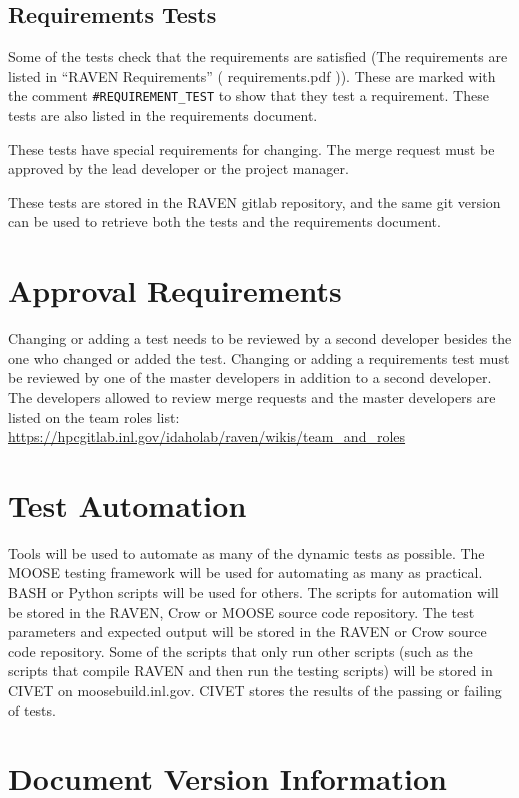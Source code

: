 \documentclass{article}
\begin{document}
\subsection{Requirements Tests}

Some of the tests check that the requirements are satisfied (The
requirements are listed in ``RAVEN Requirements'' ( requirements.pdf
)).  These are marked with the comment \verb'#REQUIREMENT_TEST' to show
that they test a requirement.  These tests are also listed in the
requirements document.

These tests have special requirements for changing.  The merge request
must be approved by the lead developer or the project manager.

These tests are stored in the RAVEN gitlab repository, and the same
git version can be used to retrieve both the tests and the
requirements document.

\section{Approval Requirements}

Changing or adding a test needs to be reviewed by a second developer
besides the one who changed or added the test.  Changing or adding a
requirements test must be reviewed by one of the master developers in
addition to a second developer.  The developers allowed to review
merge requests and the master developers are listed on the team roles
list:
\url{https://hpcgitlab.inl.gov/idaholab/raven/wikis/team_and_roles}



\section{Test Automation}

Tools will be used to automate as many of the dynamic tests as
possible.  The MOOSE testing framework will be used for automating as
many as practical.  BASH or Python scripts will be used for others.
The scripts for automation will be stored in the RAVEN, Crow or MOOSE
source code repository.  The test parameters and expected output will
be stored in the RAVEN or Crow source code repository. Some of the
scripts that only run other scripts (such as the scripts that compile
RAVEN and then run the testing scripts) will be stored in CIVET on
moosebuild.inl.gov.  CIVET stores the results of the passing or
failing of tests.

\section*{Document Version Information}


\end{document}

